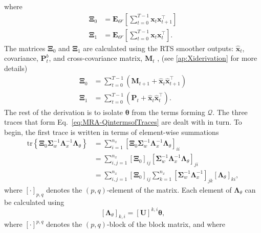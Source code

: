 \documentclass[review,authoryear,3p]{elsarticle}
\begin{document}
where
\begin{align}
\boldsymbol\Xi_0&=\mathbf E_{\Theta'}\left[\sum_{t=0}^{T-1}\mathbf x_t\mathbf x_{t+1}^\top\right] \label{eq:MRA-Xi0}\\
\boldsymbol\Xi_1&=\mathbf E_{\Theta'}\left[\sum_{t=0}^{T-1}\mathbf x_t\mathbf x_{t}^\top\right] \label{eq:MRA-Xi1}.
\end{align}
The matrices $\boldsymbol\Xi_0$ and $\boldsymbol\Xi_1$ are calculated using the RTS smoother outputs: $\hat{\mathbf x}_t$, covariance, $\mathbf P_t^b$, and cross-covariance matrix, $\mathbf M_t$ \cite{Gibsona2005}, (see \ref{ap:Xiderivation} for more details)
\begin{align}
\boldsymbol\Xi_0&=\sum_{t=0}^{T-1}\left(\mathbf M_{t+1}+\mathbf{\hat x}_t\mathbf{\hat x}_{t+1}^\top\right) \label{eq:Xi0} \\
 \boldsymbol\Xi_1&=\sum_{t=0}^{T-1}\left(\mathbf P_t+\mathbf{\hat x}_t\mathbf{\hat x}_t^\top\right).  \label{eq:Xi1}
\end{align} 
The rest of the derivation is to isolate $\boldsymbol\theta$ from the terms forming $\mathcal{Q}$. The three traces that form Eq.~\eqref{eq:MRA-QintermsofTraces} are dealt with in turn. To begin, the first trace is written in terms of element-wise summations
\begin{align}\label{eq:MRA-trace1}
\mathrm{tr} \left\lbrace \boldsymbol \Xi_0\boldsymbol\Sigma_w^{-1}\boldsymbol\Lambda_x^{-1}\boldsymbol\Lambda_{\theta}\right\rbrace&=\sum_{i=1}^{n_x}\left[ \boldsymbol \Xi_0\boldsymbol\Sigma_w^{-1}\boldsymbol\Lambda_x^{-1}\boldsymbol\Lambda_{\theta}\right]_{ii} \nonumber \\
&=\sum_{i,j=1}^{n_x}\left[ \boldsymbol\Xi_0\right]_{ij}\left[\boldsymbol\Sigma_w^{-1}\boldsymbol\Lambda_x^{-1}  \boldsymbol\Lambda_{\theta}\right]_{ji}\nonumber\\
&=\sum_{i,j=1}^{n_x}\left[ \boldsymbol\Xi_0\right]_{ij}\sum_{k=1}^{n_x}\left[\boldsymbol\Sigma_w^{-1}\boldsymbol\Lambda_x^{-1} \right]_{jk} \left[ \boldsymbol\Lambda_{\theta}\right]_{ki},
\end{align}
where $[\cdot]_{p,q}$ denotes the $\left(p,q\right)$-element of the matrix. Each element of $\boldsymbol\Lambda_{\theta}$ can be calculated using
\begin{equation}\label{eq:MRA-LambdaThetaElements}
\left[ \boldsymbol\Lambda_{\theta}\right] _{k,i}=\left[ \mathbf U\right]^{k,i}\boldsymbol\theta,
\end{equation}
where $ [\cdot]^{p,q}$ denotes the $\left(p,q\right)$-block of the block matrix, and where
\end{document}

